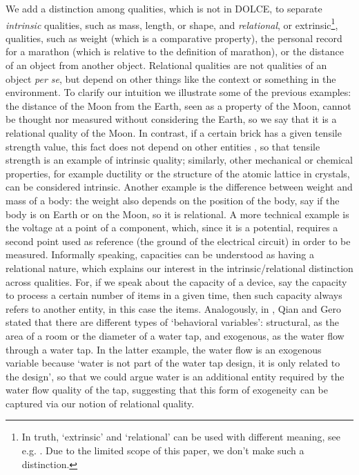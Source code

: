 \documentclass[sw]{iosart2x}
\newcommand{\DOLCE}{\textsc{DOLCE}\xspace} %
\newcommand{\firstTimeKeyWord}[1]{\textit{#1}}
\newcommand{\quotes}[1]{`#1'}
\begin{document}
We add a distinction among qualities, which is not in \DOLCE, to separate \firstTimeKeyWord{intrinsic} qualities, such as mass, length, or shape, and \firstTimeKeyWord{relational}, or extrinsic\footnote{In truth, `extrinsic' and `relational' can be used with different meaning, see e.g. \cite{sep-intrinsic-extrinsic}. Due to the limited scope of this paper, we don't make such a distinction.}, qualities, such as weight (which is a comparative property), the personal record for a marathon (which is relative to the definition of marathon), or the distance of an object from another object. %
Relational qualities are not qualities of an object \textit{per se}, but depend on other things like the context or something in the environment.
To clarify our intuition we illustrate some of the previous examples: the distance of the Moon from the Earth, seen as a property of the Moon, cannot be thought nor measured without considering the Earth, so we say that it is a relational quality of the Moon. In contrast, if a certain brick has a given tensile strength value, %
this fact does not depend on other entities%
, so that tensile strength is an example of intrinsic quality; 
similarly, other mechanical or chemical properties, for example ductility or the structure of the atomic lattice in crystals, can be considered intrinsic. 
Another example is the difference between weight and mass of a body: the weight also depends on the position of the body, say if the body is on Earth or on the Moon, so it is relational. 
A more technical example is the voltage at a point of a component, which, since it is a potential, requires a second point used as  reference (the ground of the electrical circuit) in order to be measured. 
Informally speaking, capacities can be understood as having a relational nature, which explains our interest in the intrinsic/relational distinction across qualities. For, if we speak about the capacity of a device, say the capacity to process a certain number of items in a given time, then such capacity always refers to another entity, in this case the items.  Analogously, in \cite{qianFunctionBehaviorStructure1996}, Qian and Gero stated that there are different types of \quotes{behavioral variables}: structural, as the area of a room or the diameter of a water tap, and exogenous, as the water flow through a water tap. In the latter example, the water flow is an exogenous variable because \quotes{water is not part of the
water tap design, it is only related to the design}, so that we could argue water is an additional entity required by the water flow quality of the tap, suggesting that this form of exogeneity can be captured via our notion of relational quality.  
\end{document}
